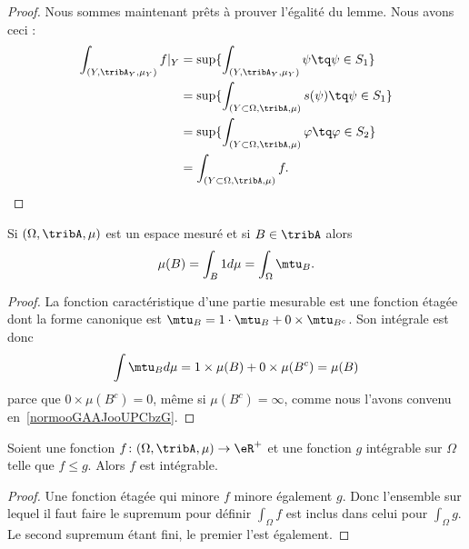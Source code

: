 \begin{proof}
	Nous sommes maintenant prêts à prouver l'égalité du lemme. Nous avons ceci :
	\begin{subequations}
		\begin{align}
			\int_{(Y,\tribA_Y,\mu_Y)}f|_Y & =\sup\{ \int_{(Y,\tribA_Y,\mu_Y)}\psi\tq \psi\in S_1 \}                 \\
			                              & =\sup\{ \int_{(Y\subset \Omega,\tribA,\mu)}s(\psi)\tq \psi\in S_1 \}    \\
			                              & =\sup\{ \int_{(Y\subset \Omega,\tribA,\mu)}\varphi\tq \varphi\in S_2 \} \\
			                              & =\int_{(Y\subset\Omega,\tribA,\mu)}f.
		\end{align}
	\end{subequations}
\end{proof}

\begin{lemma}       \label{LemooPJLNooVKrBhN}
	Si \( (\Omega,\tribA,\mu)\) est un espace mesuré et si \( B\in \tribA\) alors
	\begin{equation}
		\mu(B)=\int_B1d\mu=\int_{\Omega}\mtu_B.
	\end{equation}
\end{lemma}

\begin{proof}
	La fonction caractéristique d'une partie mesurable est une fonction étagée dont la forme canonique est \( \mtu_B=1\cdot \mtu_B+0\times \mtu_{B^c}\). Son intégrale est donc
	\begin{equation}
		\int\mtu_Bd\mu=1\times \mu(B)+0\times \mu(B^c)=\mu(B)
	\end{equation}
	parce que \( 0\times \mu(B^c)=0\), même si \( \mu(B^c)=\infty\), comme nous l'avons convenu en~\ref{normooGAAJooUPCbzG}.
\end{proof}

\begin{proposition}      \label{PROPooGTMVooPHcrRl}
	Soient une fonction \( f\colon (\Omega,\tribA,\mu)\to \eR^+\) et une fonction \( g\) intégrable sur \( \Omega\) telle que \( f\leq g\). Alors \( f\) est intégrable.
\end{proposition}

\begin{proof}
	Une fonction étagée qui minore \( f\) minore également \( g\). Donc l'ensemble sur lequel il faut faire le supremum pour définir \( \int_{\Omega}f\) est inclus dans celui pour \( \int_{\Omega}g\). Le second supremum étant fini, le premier l'est également.
\end{proof}

